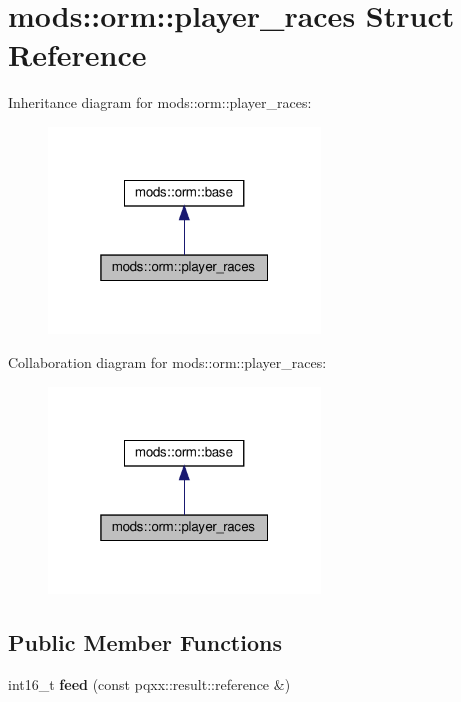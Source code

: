 \hypertarget{structmods_1_1orm_1_1player__races}{}\section{mods\+:\+:orm\+:\+:player\+\_\+races Struct Reference}
\label{structmods_1_1orm_1_1player__races}


Inheritance diagram for mods\+:\+:orm\+:\+:player\+\_\+races\+:
\nopagebreak
\begin{figure}[H]
\begin{center}
\leavevmode
\includegraphics[width=205pt]{structmods_1_1orm_1_1player__races__inherit__graph}
\end{center}
\end{figure}


Collaboration diagram for mods\+:\+:orm\+:\+:player\+\_\+races\+:
\nopagebreak
\begin{figure}[H]
\begin{center}
\leavevmode
\includegraphics[width=205pt]{structmods_1_1orm_1_1player__races__coll__graph}
\end{center}
\end{figure}
\subsection*{Public Member Functions}
\begin{DoxyCompactItemize}
\item 
\mbox{\label{structmods_1_1orm_1_1player__races_a8c765b0c5aa5d5bdf2247dcca209445f}} 
int16\+\_\+t {\bfseries feed} (const pqxx\+::result\+::reference \&)
\end{DoxyCompactItemize}
